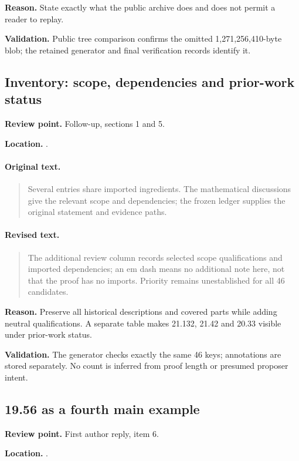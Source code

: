 \noindent\textbf{Reason.} State exactly what the public archive does and does not permit a reader to replay.

\noindent\textbf{Validation.} Public tree comparison confirms the omitted 1,271,256,410-byte blob; the retained generator and final verification records identify it.

\subsection{Inventory: scope, dependencies and prior-work status}
\noindent\textbf{Review point.} Follow-up, sections 1 and 5.\par
\noindent\textbf{Location.} .

\paragraph{Original text.}
\begin{quote}\small
Several entries share imported ingredients. The mathematical discussions
give the relevant scope and dependencies; the frozen ledger supplies the
original statement and evidence paths.
\end{quote}

\paragraph{Revised text.}
\begin{quote}\small
The additional review column records selected scope qualifications and
imported dependencies; an em dash means no additional note here, not
that the proof has no imports. Priority remains unestablished for all
46 candidates.
\end{quote}

\noindent\textbf{Reason.} Preserve all historical descriptions and covered parts while adding neutral qualifications. A separate table makes 21.132, 21.42 and 20.33 visible under prior-work status.

\noindent\textbf{Validation.} The generator checks exactly the same 46 keys; annotations are stored separately. No count is inferred from proof length or presumed proposer intent.

\subsection{19.56 as a fourth main example}
\noindent\textbf{Review point.} First author reply, item 6.\par
\noindent\textbf{Location.} .


